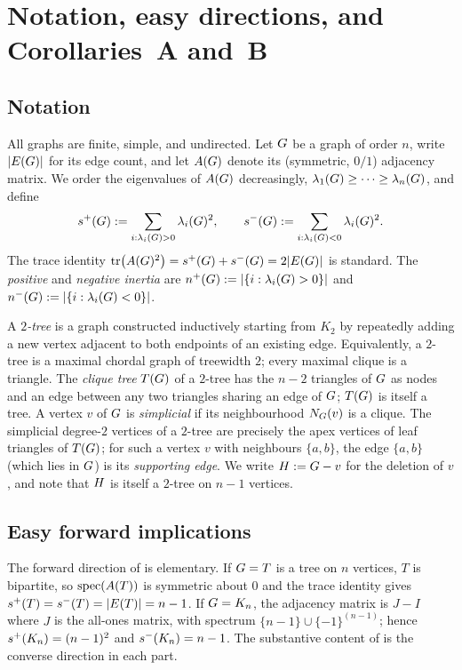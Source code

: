 \section{Notation, easy directions, and Corollaries~A and~B}\label{sec:notation}

\subsection{Notation}\label{sec:notation:basic}

All graphs are finite, simple, and undirected. Let $G$ be a graph
of order $n$, write $|E(G)|$ for its edge count, and let
$A(G)$ denote its (symmetric, $0/1$) adjacency matrix. We
order the eigenvalues of $A(G)$ decreasingly,
$\lambda_{1}(G) \ge \cdots \ge \lambda_{n}(G)$, and define
\[
s^{+}(G) := \sum_{i: \lambda_{i}(G) > 0} \lambda_{i}(G)^{2},
\qquad
s^{-}(G) := \sum_{i: \lambda_{i}(G) < 0} \lambda_{i}(G)^{2}.
\]
The trace identity
$\operatorname{tr}\bigl(A(G)^{2}\bigr) = s^{+}(G) + s^{-}(G) =
2|E(G)|$ is standard. The \emph{positive} and \emph{negative
inertia} are
$n^{+}(G) := |\{i : \lambda_{i}(G) > 0\}|$ and
$n^{-}(G) := |\{i : \lambda_{i}(G) < 0\}|$.

A \emph{$2$-tree} is a graph constructed inductively starting from
$K_{2}$ by repeatedly adding a new vertex adjacent to both endpoints of
an existing edge. Equivalently, a $2$-tree is a maximal chordal graph
of treewidth $2$; every maximal clique is a triangle. The
\emph{clique tree} $T(G)$ of a $2$-tree has the
$n - 2$ triangles of $G$ as nodes and an edge between any two
triangles sharing an edge of $G$; $T(G)$ is itself a
tree. A vertex $v$ of $G$ is \emph{simplicial} if its neighbourhood
$N_{G}(v)$ is a clique. The simplicial degree-$2$ vertices of a
$2$-tree are precisely the apex vertices of leaf triangles of
$T(G)$; for such a vertex $v$ with neighbours $\{a, b\}$,
the edge $\{a, b\}$ (which lies in $G$) is its \emph{supporting
edge}. We write $H := G - v$ for the deletion of $v$, and
note that $H$ is itself a $2$-tree on $n - 1$ vertices.

\subsection{Easy forward implications}\label{sec:notation:easy}

The forward direction of  is elementary. If $G = T$
is a tree on $n$ vertices, $T$ is bipartite, so $\operatorname{spec}(A(T))$ is
symmetric about $0$ and the trace identity gives
$s^{+}(T) = s^{-}(T) = |E(T)| = n - 1$. If $G = K_{n}$, the
adjacency matrix is $J - I$ where $J$ is the all-ones matrix, with
spectrum $\{n - 1\} \cup \{-1\}^{(n-1)}$; hence
$s^{+}(K_{n}) = (n - 1)^{2}$ and $s^{-}(K_{n}) = n - 1$. The
substantive content of  is the converse direction in each
part.


